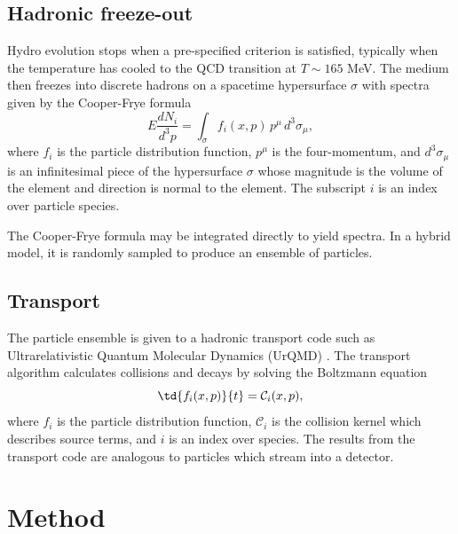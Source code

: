 \documentclass[reprint,amsmath]{revtex4-1}
\begin{document}
\subsection{Hadronic freeze-out}

Hydro evolution stops when a pre-specified criterion is satisfied, typically when the temperature has cooled to the QCD transition at
$T \sim 165$ MeV.  The medium then freezes into discrete hadrons on a spacetime hypersurface $\sigma$ with spectra given by the Cooper-Frye
formula \cite{cf}
\begin{equation}
  E \frac{dN_i}{d^3p} = \int_\sigma f_i(x,p) \, p^\mu \, d^3\sigma_\mu,
\end{equation}
where $f_i$ is the particle distribution function, $p^\mu$ is the four-momentum, and $d^3\sigma_\mu$ is an infinitesimal piece of the
hypersurface $\sigma$ whose magnitude is the volume of the element and direction is normal to the element.  The subscript $i$ is an
index over particle species.

The Cooper-Frye formula may be integrated directly to yield spectra.  In a hybrid model, it is randomly sampled to produce an ensemble
of particles.


\subsection{Transport}

The particle ensemble is given to a hadronic transport code such as Ultrarelativistic Quantum Molecular Dynamics (UrQMD)
\cite{urqmd1,urqmd2}.  The transport algorithm calculates collisions and decays by solving the Boltzmann equation
\begin{equation}
  \td{f_i(x,p)}{t} = \mathcal C_i(x,p),
\end{equation}
where $f_i$ is the particle distribution function, $\mathcal C_i$ is the collision kernel which describes source terms, and $i$ is an index
over species.  The results from the transport code are analogous to particles which stream into a detector.




\section{Method}
\end{document}
